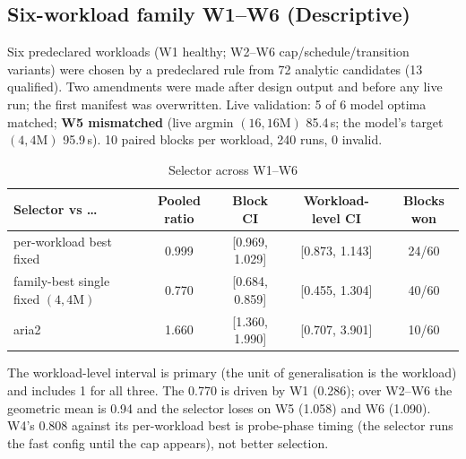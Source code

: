 \subsection{Six-workload family W1--W6 (Descriptive)}
Six predeclared workloads (W1 healthy; W2--W6 cap/schedule/transition variants) were chosen by a predeclared rule from 72 analytic candidates (13 qualified). Two amendments were made after design output and before any live run; the first manifest was overwritten. Live validation: 5 of 6 model optima matched; \textbf{W5 mismatched} (live argmin $(16,16\text{M})$ 85.4\,s; the model's target $(4,4\text{M})$ 95.9\,s). 10 paired blocks per workload, 240 runs, 0 invalid.

\begin{table}[H]\centering\small
\caption{Selector across W1--W6}\label{tab:w16}
\begin{tabular}{@{}lcccc@{}}
\toprule
\textbf{Selector vs \dots} & \textbf{Pooled ratio} & \textbf{Block CI} & \textbf{Workload-level CI} & \textbf{Blocks won}\\
\midrule
per-workload best fixed & 0.999 & [0.969, 1.029] & [0.873, 1.143] & 24/60\\
family-best single fixed $(4,4\text{M})$ & 0.770 & [0.684, 0.859] & [0.455, 1.304] & 40/60\\
aria2 & 1.660 & [1.360, 1.990] & [0.707, 3.901] & 10/60\\
\bottomrule
\end{tabular}
\end{table}
The workload-level interval is primary (the unit of generalisation is the workload) and includes 1 for all three. The 0.770 is driven by W1 (0.286); over W2--W6 the geometric mean is 0.94 and the selector loses on W5 (1.058) and W6 (1.090). W4's 0.808 against its per-workload best is probe-phase timing (the selector runs the fast config until the cap appears), not better selection.

